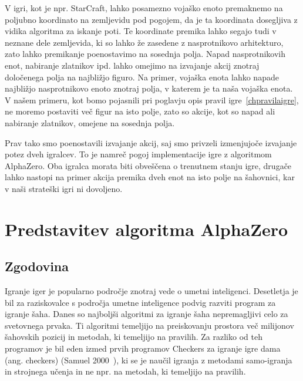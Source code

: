 \documentclass[a4paper, 12pt]{book}
\begin{document}
V igri, kot je npr. StarCraft, lahko posamezno vojaško enoto premaknemo na poljubno koordinato na zemljevidu pod pogojem, da je ta koordinata dosegljiva z vidika algoritma za iskanje poti.
Te koordinate premika lahko segajo tudi v neznane dele zemljevida, ki so lahko že zasedene z nasprotnikovo arhitekturo, zato lahko premikanje poenostavimo na sosednja polja.
Napad nasprotnikovih enot, nabiranje zlatnikov ipd. lahko omejimo na izvajanje akcij znotraj določenega polja na najbližjo figuro.
Na primer, vojaška enota lahko napade najbližjo nasprotnikovo enoto znotraj polja, v katerem je ta naša vojaška enota.
V našem primeru, kot bomo pojasnili pri poglavju opis pravil igre~\ref{chpravilaigre}, ne moremo postaviti več figur na isto polje, zato so akcije, kot so napad ali nabiranje zlatnikov, omejene na sosednja polja.

Prav tako smo poenostavili izvajanje akcij, saj smo privzeli izmenjujoče izvajanje potez dveh igralcev.
To je namreč pogoj implementacije igre z algoritmom AlphaZero.
Oba igralca morata biti obveščena o trenutnem stanju igre, drugače lahko nastopi na primer akcija premika dveh enot na isto polje na šahovnici, kar v naši strateški igri ni dovoljeno.


\chapter{Predstavitev algoritma AlphaZero}
\label{alphazero}
\section{Zgodovina}

Igranje iger je popularno področje znotraj vede o umetni inteligenci. 
Desetletja je bil za raziskovalce s področja umetne inteligence podvig razviti program za igranje šaha.
Danes so najboljši algoritmi za igranje šaha nepremagljivi celo za svetovnega prvaka.
Ti algoritmi temeljijo na preiskovanju prostora več milijonov šahovskih pozicij in metodah, ki temeljijo na pravilih.
Za razliko od teh programov je bil eden izmed prvih programov Checkers za igranje igre dama (ang. checkers) (Samuel 2000~{\cite{samuel2000some}}), ki se je naučil igranja z metodami samo-igranja in strojnega učenja in ne npr. na metodah, ki temeljijo na pravilih.
\end{document}

